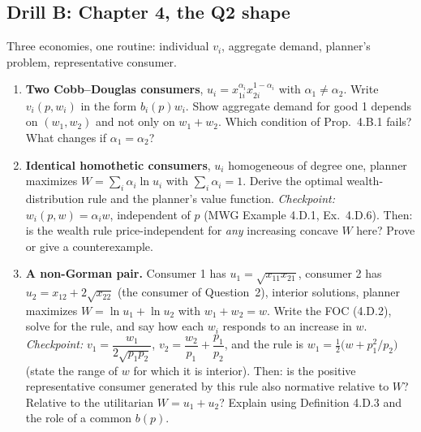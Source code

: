 \documentclass[11pt]{article}
\begin{document}
\subsection{Drill B: Chapter 4, the Q2 shape}
\begin{todo}{Three economies, one routine: individual $v_i$, aggregate demand, planner's problem, representative consumer.}
\begin{enumerate}
\item \textbf{Two Cobb--Douglas consumers}, $u_i=x_{1i}^{\alpha_i}x_{2i}^{1-\alpha_i}$ with $\alpha_1\ne\alpha_2$. Write $v_i(p,w_i)$ in the form $b_i(p)w_i$. Show aggregate demand for good 1 depends on $(w_1,w_2)$ and not only on $w_1+w_2$. Which condition of Prop.~4.B.1 fails? What changes if $\alpha_1=\alpha_2$?
\item \textbf{Identical homothetic consumers}, $u_i$ homogeneous of degree one, planner maximizes $W=\sum_i\alpha_i\ln u_i$ with $\sum_i\alpha_i=1$. Derive the optimal wealth-distribution rule and the planner's value function. \emph{Checkpoint:} $w_i(p,w)=\alpha_iw$, independent of $p$ (MWG Example 4.D.1, Ex.~4.D.6). Then: is the wealth rule price-independent for \emph{any} increasing concave $W$ here? Prove or give a counterexample.
\item \textbf{A non-Gorman pair.} Consumer 1 has $u_1=\sqrt{x_{11}x_{21}}$, consumer 2 has $u_2=x_{12}+2\sqrt{x_{22}}$ (the consumer of Question~2), interior solutions, planner maximizes $W=\ln u_1+\ln u_2$ with $w_1+w_2=w$. Write the FOC (4.D.2), solve for the rule, and say how each $w_i$ responds to an increase in $w$. \emph{Checkpoint:} $v_1=\dfrac{w_1}{2\sqrt{p_1p_2}}$, $v_2=\dfrac{w_2}{p_1}+\dfrac{p_1}{p_2}$, and the rule is $w_1=\tfrac12\big(w+p_1^2/p_2\big)$ (state the range of $w$ for which it is interior). Then: is the positive representative consumer generated by this rule also normative relative to $W$? Relative to the utilitarian $W=u_1+u_2$? Explain using Definition 4.D.3 and the role of a common $b(p)$.
\end{enumerate}
\end{todo}
\end{document}
